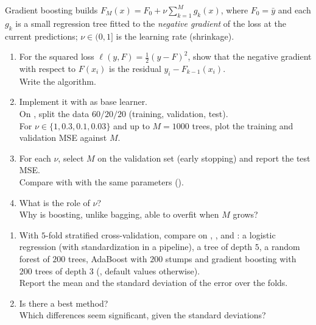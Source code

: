 \documentclass[a4paper,11pt]{article}
\begin{document}
\label{p3:gb}

Gradient boosting builds $F_M(x)=F_0+\nu\sum_{k=1}^Mg_k(x)$, where $F_0=\bar y$ and each $g_k$ is a small regression tree
fitted to the \emph{negative gradient} of the loss at the current predictions; $\nu\in(0,1]$ is the learning rate
(shrinkage).

\begin{enumerate}
\item For the squared loss $\ell(y,F)=\frac12(y-F)^2$, show that the negative gradient with respect to $F(x_i)$ is the
      residual $y_i-F_{k-1}(x_i)$.\\
      Write the algorithm.
\item Implement it with  as base learner.\\
      On , split the data
      $60/20/20$ (training, validation, test).\\
      For $\nu\in\{1,0.3,0.1,0.03\}$ and up to $M=1000$ trees, plot the training
      and validation MSE against $M$.
\item For each $\nu$, select $M$ on the validation set (early stopping) and report the test MSE.\\
      Compare with
       with the same parameters ().
\item What is the role of $\nu$?\\
      Why is boosting, unlike bagging, able to overfit when $M$ grows?
\end{enumerate}

\label{p3:compare}

\begin{enumerate}
\item With $5$-fold stratified cross-validation, compare on , ,  and
      : a logistic regression (with standardization in a pipeline), a tree of depth $5$, a random forest
      of $200$ trees, AdaBoost with $200$ stumps and gradient boosting with $200$ trees of depth $3$ (,
      default values otherwise).\\
      Report the mean and the standard deviation of the error over the folds.
\item Is there a best method?\\
      Which differences seem significant, given the standard deviations?
\end{enumerate}
\end{document}
